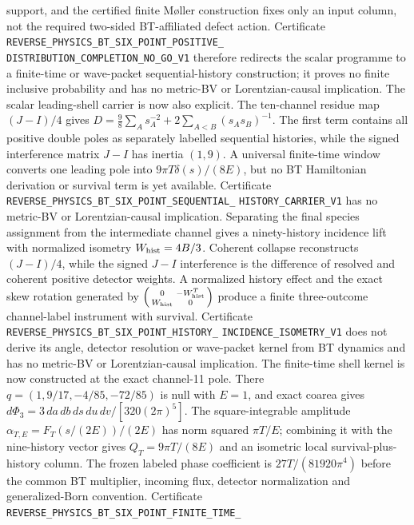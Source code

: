 \documentclass[11pt]{article}
\theoremstyle{definition}
\theoremstyle{remark}
\begin{document}
support, and the certified finite Møller construction fixes only an input
column, not the required two-sided BT-affiliated defect action.  Certificate
\texttt{REVERSE\_PHYSICS\_BT\_SIX\_POINT\_POSITIVE\_}
\allowbreak\texttt{DISTRIBUTION\_COMPLETION\_NO\_GO\_V1}
therefore redirects the scalar programme to a finite-time or wave-packet
sequential-history construction; it proves no finite inclusive probability
and has no metric-BV or Lorentzian-causal implication.
The scalar leading-shell carrier is now also explicit.  The ten-channel
residue map $(J-I)/4$ gives
$D=\frac98\sum_As_A^{-2}+2\sum_{A<B}(s_As_B)^{-1}$.  The first term contains
all positive double poles as separately labelled sequential histories, while
the signed interference matrix $J-I$ has inertia $(1,9)$.  A universal
finite-time window converts one leading pole into
$9\pi T\delta(s)/(8E)$, but no BT Hamiltonian derivation or survival term is
yet available.  Certificate
\texttt{REVERSE\_PHYSICS\_BT\_SIX\_POINT\_SEQUENTIAL\_}
\allowbreak\texttt{HISTORY\_CARRIER\_V1}
has no metric-BV or Lorentzian-causal implication.
Separating the final species assignment from the intermediate channel gives a
ninety-history incidence lift with normalized isometry $W_{\rm hist}=4B/3$.
Coherent collapse reconstructs $(J-I)/4$, while the signed $J-I$ interference
is the difference of resolved and coherent positive detector weights.  A
normalized history effect and the exact skew rotation generated by
$\left(\begin{smallmatrix}0&-W_{\rm hist}^T\\W_{\rm hist}&0\end{smallmatrix}\right)$
produce a finite three-outcome channel-label instrument with survival.
Certificate
\texttt{REVERSE\_PHYSICS\_BT\_SIX\_POINT\_HISTORY\_}
\allowbreak\texttt{INCIDENCE\_ISOMETRY\_V1}
does not derive its angle, detector resolution or wave-packet kernel from BT
dynamics and has no metric-BV or Lorentzian-causal implication.
The finite-time shell kernel is now constructed at the exact channel-11 pole.
There $q=(1,9/17,-4/85,-72/85)$ is null with $E=1$, and exact coarea gives
$d\Phi_3=3\,da\,db\,ds\,du\,dv/[320(2\pi)^5]$.  The square-integrable
amplitude $\alpha_{T,E}=F_T(s/(2E))/(2E)$ has norm squared $\pi T/E$;
combining it with the nine-history vector gives $Q_T=9\pi T/(8E)$ and an
isometric local survival-plus-history column.  The frozen labeled phase
coefficient is $27T/(81920\pi^4)$ before the common BT multiplier, incoming
flux, detector normalization and generalized-Born convention.  Certificate
\texttt{REVERSE\_PHYSICS\_BT\_SIX\_POINT\_FINITE\_TIME\_}
\end{document}

